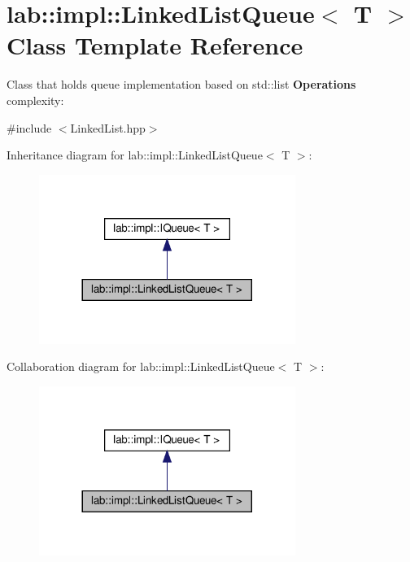 \hypertarget{classlab_1_1impl_1_1LinkedListQueue}{}\section{lab\+:\+:impl\+:\+:Linked\+List\+Queue$<$ T $>$ Class Template Reference}
\label{classlab_1_1impl_1_1LinkedListQueue}


Class that holds queue implementation based on std\+::list {\bfseries Operations} complexity\+:  




{\ttfamily \#include $<$Linked\+List.\+hpp$>$}



Inheritance diagram for lab\+:\+:impl\+:\+:Linked\+List\+Queue$<$ T $>$\+:
\nopagebreak
\begin{figure}[H]
\begin{center}
\leavevmode
\includegraphics[width=236pt]{classlab_1_1impl_1_1LinkedListQueue__inherit__graph}
\end{center}
\end{figure}


Collaboration diagram for lab\+:\+:impl\+:\+:Linked\+List\+Queue$<$ T $>$\+:
\nopagebreak
\begin{figure}[H]
\begin{center}
\leavevmode
\includegraphics[width=236pt]{classlab_1_1impl_1_1LinkedListQueue__coll__graph}
\end{center}
\end{figure}
